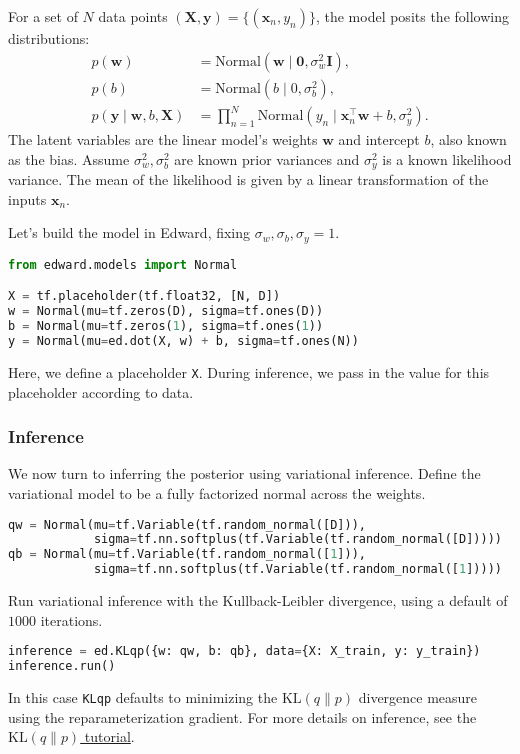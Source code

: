 For a set of $N$ data points $(\mathbf{X},\mathbf{y})=\{(\mathbf{x}_n, y_n)\}$,
the model posits the following distributions:
\begin{align*}
  p(\mathbf{w})
  &=
  \text{Normal}(\mathbf{w} \mid \mathbf{0}, \sigma_w^2\mathbf{I}),
  \\[1.5ex]
  p(b)
  &=
  \text{Normal}(b \mid 0, \sigma_b^2),
  \\
  p(\mathbf{y} \mid \mathbf{w}, b, \mathbf{X})
  &=
  \prod_{n=1}^N
  \text{Normal}(y_n \mid \mathbf{x}_n^\top\mathbf{w} + b, \sigma_y^2).
\end{align*}
The latent variables are the linear model's weights $\mathbf{w}$ and
intercept $b$, also known as the bias.
Assume $\sigma_w^2,\sigma_b^2$ are known prior variances and $\sigma_y^2$ is a
known likelihood variance. The mean of the likelihood is given by a
linear transformation of the inputs $\mathbf{x}_n$.

Let's build the model in Edward, fixing $\sigma_w,\sigma_b,\sigma_y=1$.
\begin{lstlisting}[language=Python]
from edward.models import Normal

X = tf.placeholder(tf.float32, [N, D])
w = Normal(mu=tf.zeros(D), sigma=tf.ones(D))
b = Normal(mu=tf.zeros(1), sigma=tf.ones(1))
y = Normal(mu=ed.dot(X, w) + b, sigma=tf.ones(N))
\end{lstlisting}
Here, we define a placeholder \texttt{X}. During inference, we pass in
the value for this placeholder according to data.

\subsubsection{Inference}

We now turn to inferring the posterior using variational inference.
Define the variational model to be a fully factorized normal across
the weights.
\begin{lstlisting}[language=Python]
qw = Normal(mu=tf.Variable(tf.random_normal([D])),
            sigma=tf.nn.softplus(tf.Variable(tf.random_normal([D]))))
qb = Normal(mu=tf.Variable(tf.random_normal([1])),
            sigma=tf.nn.softplus(tf.Variable(tf.random_normal([1]))))
\end{lstlisting}

Run variational inference with the Kullback-Leibler divergence, using a
default of $1000$ iterations.
\begin{lstlisting}[language=Python]
inference = ed.KLqp({w: qw, b: qb}, data={X: X_train, y: y_train})
inference.run()
\end{lstlisting}
In this case \texttt{KLqp} defaults to minimizing the
$\text{KL}(q\|p)$ divergence measure using the reparameterization
gradient.
For more details on inference, see the \href{/tutorials/klqp}{$\text{KL}(q\|p)$ tutorial}.

